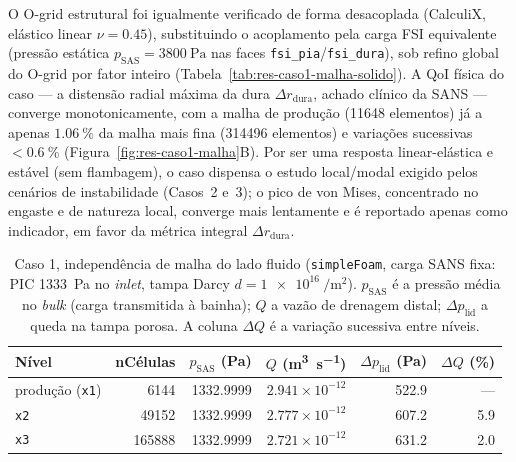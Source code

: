 \documentclass[12pt,a4paper]{article}
\begin{document}
O O-grid estrutural foi igualmente verificado de forma desacoplada (CalculiX, elástico linear $\nu = 0.45$), substituindo o acoplamento pela carga FSI equivalente (pressão estática $p_{\mathrm{SAS}} = \SI{3800}{\pascal}$ nas faces \texttt{fsi\_pia}/\texttt{fsi\_dura}), sob refino global do O-grid por fator inteiro (Tabela~\ref{tab:res-caso1-malha-solido}). A QoI física do caso --- a distensão radial máxima da dura $\Delta r_{\mathrm{dura}}$, achado clínico da SANS --- converge monotonicamente, com a malha de produção (\num{11648} elementos) já a apenas $\SI{1.06}{\%}$ da malha mais fina (\num{314496} elementos) e variações sucessivas $< \SI{0.6}{\%}$ (Figura~\ref{fig:res-caso1-malha}B). Por ser uma resposta linear-elástica e estável (sem flambagem), o caso dispensa o estudo local/modal exigido pelos cenários de instabilidade (Casos~2 e~3); o pico de von Mises, concentrado no engaste e de natureza local, converge mais lentamente e é reportado apenas como indicador, em favor da métrica integral $\Delta r_{\mathrm{dura}}$.

\begin{table}[h!]
\centering
\small
\caption{Caso 1, independência de malha do lado fluido (\texttt{simpleFoam}, carga SANS fixa: PIC \SI{1333}{\pascal} no \emph{inlet}, tampa Darcy $d = \SI{1e16}{\per\meter\squared}$). $p_{\mathrm{SAS}}$ é a pressão média no \emph{bulk} (carga transmitida à bainha); $Q$ a vazão de drenagem distal; $\Delta p_{\mathrm{lid}}$ a queda na tampa porosa. A coluna $\Delta Q$ é a variação sucessiva entre níveis.}
\label{tab:res-caso1-malha-fluido}
\begin{tabular}{l r r r r r}
\toprule
\textbf{Nível} & \textbf{nCélulas} & $p_{\mathrm{SAS}}$ (\si{\pascal}) & $Q$ (\si{\meter\cubed\per\second}) & $\Delta p_{\mathrm{lid}}$ (\si{\pascal}) & $\Delta Q$ (\si{\%}) \\
\midrule
produção (\texttt{x1}) & 6144   & 1332.9999 & $2.941\times10^{-12}$ & 522.9 & ---  \\
\texttt{x2}            & 49152  & 1332.9999 & $2.777\times10^{-12}$ & 607.2 & 5.9  \\
\texttt{x3}            & 165888 & 1332.9999 & $2.721\times10^{-12}$ & 631.2 & 2.0  \\
\bottomrule
\end{tabular}
\end{table}
\end{document}
